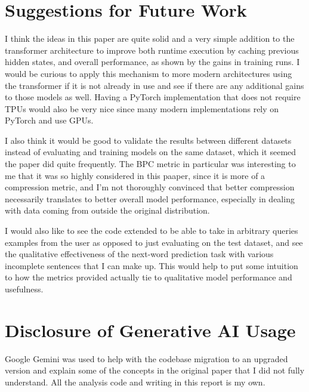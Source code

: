 \documentclass[11pt]{article}
\begin{document}
\section{Suggestions for Future Work}
I think the ideas in this paper are quite solid and a very simple addition to the transformer architecture to improve both runtime execution by caching previous hidden states, and overall performance, as shown by the gains in training runs. I would be curious to apply this mechanism to more modern architectures using the transformer if it is not already in use and see if there are any additional gains to those models as well. Having a PyTorch implementation that does not require TPUs would also be very nice since many modern implementations rely on PyTorch and use GPUs.

I also think it would be good to validate the results between different datasets instead of evaluating and training models on the same dataset, which it seemed the paper did quite frequently. The BPC metric in particular was interesting to me that it was so highly considered in this paaper, since it is more of a compression metric, and I'm not thoroughly convinced that better compression necessarily translates to better overall model performance, especially in dealing with data coming from outside the original distribution.

I would also like to see the code extended to be able to take in arbitrary queries examples from the user as opposed to just evaluating on the test dataset, and see the qualitative effectiveness of the next-word prediction task with various incomplete sentences that I can make up. This would help to put some intuition to how the metrics provided actually tie to qualitative model performance and usefulness.

\section{Disclosure of Generative AI Usage}

Google Gemini was used to help with the codebase migration to an upgraded version and explain some of the concepts in the original paper that I did not fully understand. All the analysis code and writing in this report is my own.


\end{document}
